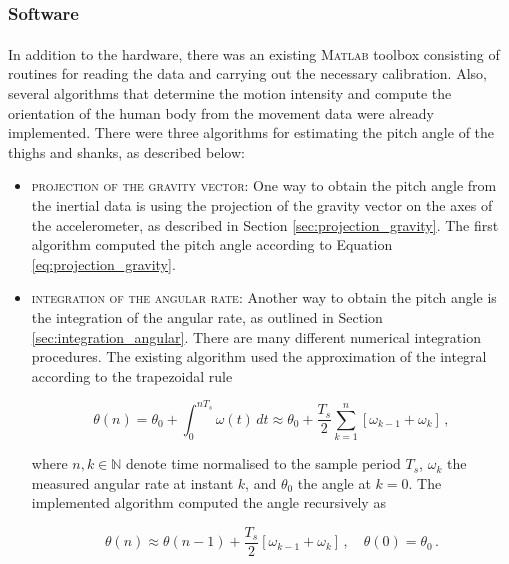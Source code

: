 \subsubsection{Software}

In addition to the hardware, there was an existing \textsc{Matlab}\textsuperscript{\textregistered} toolbox consisting of routines for reading the data and carrying out the necessary calibration. Also, several algorithms that determine the motion intensity and compute the orientation of the human body from the movement data were already implemented. There were three algorithms for estimating the pitch angle of the thighs and shanks, as described below:

\begin{itemize}
  \item \textsc{projection of the gravity vector:} One way to obtain the pitch angle from the inertial data is using the projection of the gravity vector on the axes of the accelerometer, as described in Section \ref{sec:projection_gravity}. The first algorithm computed the pitch angle according to Equation \ref{eq:projection_gravity}.
  
  \item \textsc{integration of the angular rate:} Another way to obtain the pitch angle is the integration of the angular rate, as outlined in Section \ref{sec:integration_angular}. There are many different numerical integration procedures. The existing algorithm used the approximation of the integral according to the trapezoidal rule
  
  \begin{equation}
   \theta(n) = \theta_0 + \int_{0}^{n T_s} \omega(t)\, dt \approx \theta_0 + \frac{T_s}{2} \sum_{k=1}^{n} \left[ \omega_{k-1} + \omega_{k} \right]\,,
  \end{equation}
  
  \noindent
  where $n, k \in \mathbb{N}$ denote time normalised to the sample period $T_s$, $\omega_k$ the measured angular rate at instant $k$, and $\theta_0$ the angle at $k=0$. The implemented algorithm computed the angle recursively as
  
   \begin{equation}
   \theta(n) \approx \theta(n-1) + \frac{T_s}{2} \left[ \omega_{k-1} + \omega_{k} \right]\,, \quad \theta(0) = \theta_{0}\,.
  \end{equation}
  

\end{itemize}
